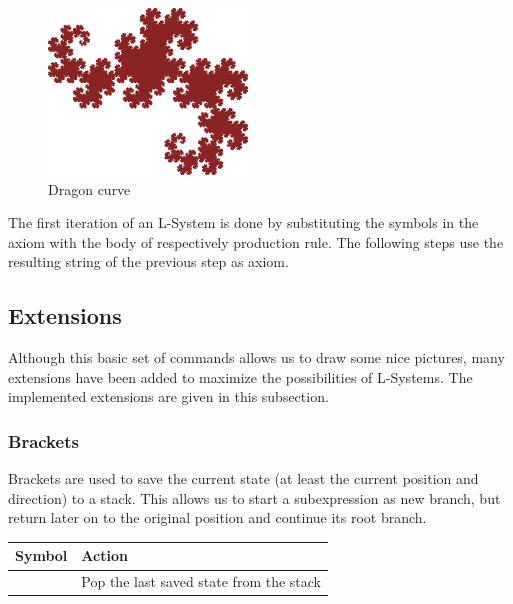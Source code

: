 \documentclass[11pt,a4paper]{article}
\begin{document}
\begin{figure}[h!]
  \centering
  \includegraphics[]{dragon.png}
  \caption{Dragon curve}
  \label{fig:dragon}
\end{figure}

The first iteration of an L-System is done by substituting the symbols in the axiom with the body of respectively production rule. The following steps use the resulting string of the previous step as axiom.

\subsection{Extensions}
Although this basic set of commands allows us to draw some nice pictures, many extensions have been added to maximize the possibilities of L-Systems. The implemented extensions are given in this subsection.

\subsubsection{Brackets}
Brackets are used to save the current state (at least the current position and direction) to a stack. This allows us to start a subexpression as new branch, but return later on to the original position and continue its root branch.

\begin{center}
\begin{tabular}{c | l}
Symbol & Action \\ \hline
[ & Push the current state to the stack \\
] & Pop the last saved state from the stack \\
\end{tabular}
\end{center}
\end{document}

